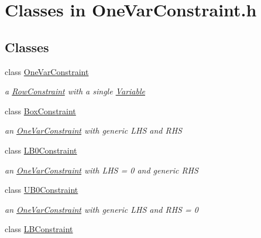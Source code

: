 \hypertarget{group___one_var_constraint___c_l_a_s_s_e_s}{}\section{Classes in One\+Var\+Constraint.\+h}
\label{group___one_var_constraint___c_l_a_s_s_e_s}
\subsection*{Classes}
\begin{DoxyCompactItemize}
\item 
class \mbox{\hyperlink{class_s_m_spp__di__unipi__it_1_1_one_var_constraint}{One\+Var\+Constraint}}
\begin{DoxyCompactList}\small\item\em a \mbox{\hyperlink{class_s_m_spp__di__unipi__it_1_1_row_constraint}{Row\+Constraint}} with a single \mbox{\hyperlink{class_s_m_spp__di__unipi__it_1_1_variable}{Variable}} \end{DoxyCompactList}\item 
class \mbox{\hyperlink{class_s_m_spp__di__unipi__it_1_1_box_constraint}{Box\+Constraint}}
\begin{DoxyCompactList}\small\item\em an \mbox{\hyperlink{class_s_m_spp__di__unipi__it_1_1_one_var_constraint}{One\+Var\+Constraint}} with generic L\+HS and R\+HS \end{DoxyCompactList}\item 
class \mbox{\hyperlink{class_s_m_spp__di__unipi__it_1_1_l_b0_constraint}{L\+B0\+Constraint}}
\begin{DoxyCompactList}\small\item\em an \mbox{\hyperlink{class_s_m_spp__di__unipi__it_1_1_one_var_constraint}{One\+Var\+Constraint}} with L\+HS = 0 and generic R\+HS \end{DoxyCompactList}\item 
class \mbox{\hyperlink{class_s_m_spp__di__unipi__it_1_1_u_b0_constraint}{U\+B0\+Constraint}}
\begin{DoxyCompactList}\small\item\em an \mbox{\hyperlink{class_s_m_spp__di__unipi__it_1_1_one_var_constraint}{One\+Var\+Constraint}} with generic L\+HS and R\+HS = 0 \end{DoxyCompactList}\item 
class \mbox{\hyperlink{class_s_m_spp__di__unipi__it_1_1_l_b_constraint}{L\+B\+Constraint}}

\end{DoxyCompactItemize}
